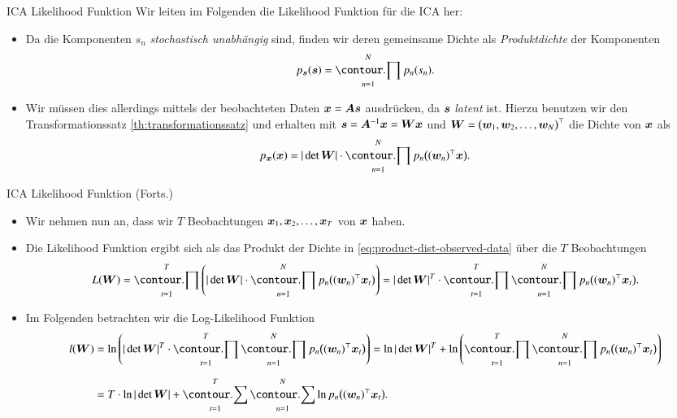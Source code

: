 \begin{frame}{ICA Likelihood Funktion}{}
	Wir leiten im Folgenden die Likelihood Funktion für die ICA her:
	
	\begin{itemize}
		\item Da die Komponenten $s_n$ \textit{stochastisch unabhängig} sind, finden wir deren gemeinsame Dichte als
			\textit{Produktdichte} der Komponenten $$p_{\bs}(\bs) = \prod_{n=1}^N p_n(s_n).$$
		\item Wir müssen dies allerdings mittels der beobachteten Daten $\bm{x} = \bm{A} \bm{s}$ ausdrücken, da $\bm{s}$ \textit{latent} ist.
			Hierzu benutzen wir den Transformationssatz \ref{th:transformationssatz} und erhalten mit
			$\bm{s} = \bm{A}^{-1} \bm{x} = \bm{W} \bm{x}$ und
			$\bm{W} = \bigl( \bm{w}_1, \bm{w}_2, \ldots, \bm{w}_N \bigr)^\top$ die Dichte von $\bm{x}$ als
		\begin{equation} \label{eq:product-dist-observed-data}
			p_{\bx}(\bx) = \vert \det \bW \vert \cdot \prod_{n=1}^N p_n\bigl( (\bw_n)^\top \bx \bigr).
		\end{equation}
	\end{itemize}
\end{frame}


\begin{frame}{ICA Likelihood Funktion (Forts.)}{}	
	\begin{itemize}
		\item Wir nehmen nun an, dass wir $T$ Beobachtungen $\bm{x}_1, \bm{x}_2, \ldots, \bm{x}_T$ von $\bm{x}$ haben.
		\item Die Likelihood Funktion ergibt sich als das Produkt der Dichte in \eqref{eq:product-dist-observed-data}
		über die $T$ Beobachtungen
		\begin{equation*}
			L(\bW)
				= \prod_{t=1}^T \left( \vert \det \bW \vert \cdot \prod_{n=1}^N p_n\bigl( (\bw_n)^\top \bx_t \bigr) \right)
				= \vert \det \bW \vert^T \cdot \prod_{t=1}^T \prod_{n=1}^N p_n\bigl( (\bw_n)^\top \bx_t \bigr).
		\end{equation*}
		\item Im Folgenden betrachten wir die Log-Likelihood Funktion
		\begin{align*}
			l(\bW)
				&= \ln\left(
					\vert \det \bW \vert^T \cdot \prod_{t=1}^T \prod_{n=1}^N p_n\bigl( (\bw_n)^\top \bx_t \bigr)
				\right)
					= \ln \vert \det \bW \vert^T + \ln\left(
						\prod_{t=1}^T \prod_{n=1}^N p_n\bigl( (\bw_n)^\top \bx_t \bigr)
					\right)
		\\[2mm]
				&= T \cdot \ln \vert \det \bW \vert + \sum_{t=1}^T \sum_{n=1}^N \ln p_n\bigl( (\bw_n)^\top \bx_t \bigr).
		\end{align*}
	\end{itemize}
\end{frame}


